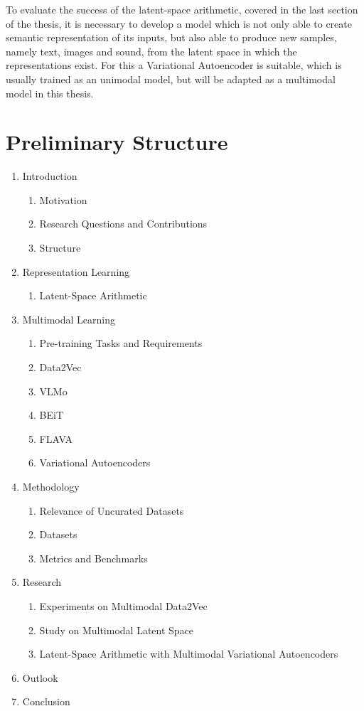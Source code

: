 To evaluate the success of the latent-space arithmetic, covered in the last section of the thesis, it is necessary
to develop a model which is not only able to create semantic representation of its inputs, but also able to
produce new samples, namely text, images and sound, from the latent space in which the representations exist.
For this a Variational Autoencoder is suitable, which is usually trained as an unimodal model, but will be
adapted as a multimodal model in this thesis.

\chapter{Preliminary Structure}

\begin{enumerate}
    \item Introduction
        \begin{enumerate}
            \item Motivation
            \item Research Questions and Contributions
            \item Structure
        \end{enumerate}
    \item Representation Learning
        \begin{enumerate}
            \item Latent-Space Arithmetic
        \end{enumerate}
    \item Multimodal Learning
        \begin{enumerate}
            \item Pre-training Tasks and Requirements
            \item Data2Vec
            \item VLMo
            \item BEiT
            \item FLAVA
            \item Variational Autoencoders
        \end{enumerate}
    \item Methodology
        \begin{enumerate}
            \item Relevance of Uncurated Datasets
            \item Datasets
            \item Metrics and Benchmarks
        \end{enumerate}
    \item Research
        \begin{enumerate}
            \item Experiments on Multimodal Data2Vec
            \item Study on Multimodal Latent Space
            \item Latent-Space Arithmetic with Multimodal Variational Autoencoders
        \end{enumerate}
    \item Outlook
    \item Conclusion
\end{enumerate}

